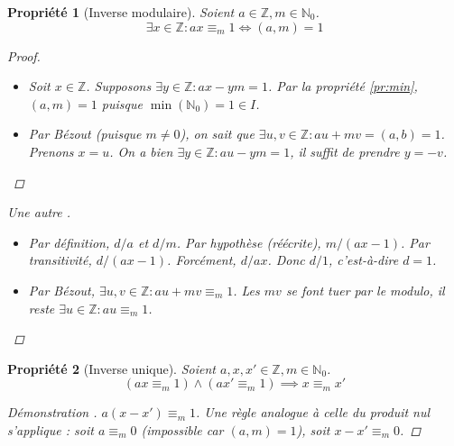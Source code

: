 \documentclass[11pt,twocolumn]{article}
\theoremstyle{plain}
\newtheorem{pr}{Propriété}
\newcommand{\esN}{\mathbb{N}} %
\newcommand{\esZ}{\mathbb{Z}} %
\newcommand{\dbi}{\Longleftrightarrow}
\newenvironment{cproof}[1]{\begin{proof}[Démonstration \cite{#1}]}{\end{proof}}
\begin{document}
\newpage
\begin{pr}[Inverse modulaire]
	Soient $a \in \esZ, m \in \esN_0$. \[
		\exists x \in \esZ : ax \equiv_m 1 \dbi (a,m)=1
	\]
	\begin{proof} ~
		\begin{itemize}
			\item[$\Rightarrow$]
				Soit $x \in \esZ$.
				Supposons $\exists y \in \esZ : ax-ym=1$.
				Par la propriété \ref{pr:min},
				$(a,m)=1$ puisque $\min(\esN_0)=1\in I$.
			\item[$\Leftarrow$]
				Par Bézout (puisque $m \neq 0$), on sait que
				$\exists u, v \in \esZ : au+mv = (a, b) = 1$.
				Prenons $x=u$. On a bien $\exists y \in \esZ : au-ym=1$,
				il suffit de prendre $y=-v$.
		\end{itemize}
	\end{proof}
	\begin{proof}[Une autre \cite{Buys}] ~
		\begin{itemize}
			\item[$\Rightarrow$]
				Par définition, $d/a$ et $d/m$.
				Par hypothèse (réécrite), $m/(ax-1)$.
				Par transitivité, $d/(ax-1)$.
				Forcément, $d/ax$.
				Donc $d/1$, c'est-à-dire $d=1$.
			\item[$\Leftarrow$]
				Par Bézout, $\exists u, v \in \esZ : au+mv \equiv_m 1$.
				Les $mv$ se font tuer par le modulo, il reste
				$\exists u \in \esZ : au \equiv_m 1$.
		\end{itemize}
	\end{proof}
\end{pr}
\begin{pr}[Inverse unique]
	Soient $a, x, x' \in \esZ, m \in \esN_0$. \[
		(ax \equiv_m 1) \land (ax' \equiv_m 1) \implies x \equiv_m x'
	\]
	\begin{cproof}{Buys}
		$a(x-x') \equiv_m 1$.
		Une règle analogue à celle du produit nul s'applique :
		soit $a \equiv_m 0$ (impossible car $(a,m)=1$),
		soit $x-x' \equiv_m 0$.
	\end{cproof}
\end{pr}
\end{document}

